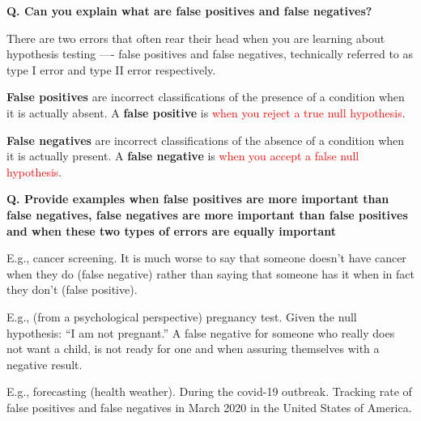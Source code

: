 \begin{frame}[fragile]{\textbf{Q. Can you explain what are false positives and false negatives?}}
  \begin{wideitemize}
  \item There are two errors that often rear their head when you are learning
    about hypothesis testing —- false positives and false negatives, technically
    referred to as type I error and type II error respectively.
  \item \textbf{False positives} are incorrect classifications of the presence
    of a condition when it is actually absent. A \textbf{false positive} is \textcolor{red}{when you
      reject a true null hypothesis}.
  \item \textbf{False negatives} are incorrect classifications of the absence of
    a condition when it is actually present. A \textbf{false negative} is \textcolor{red}{when you accept
      a false null hypothesis}.
  \end{wideitemize}
\end{frame}

\begin{frame}[fragile]{\textbf{Q. Provide examples when false positives are more
      important than false negatives, false negatives are more important than
      false positives and when these two types of errors are equally important}}
  \begin{wideitemize}
  \item E.g., cancer screening. It is much worse to say that someone
    doesn't have cancer when they do (false negative) rather than saying that
    someone has it when in fact they don't (false positive).
  \item E.g., (from a psychological perspective) pregnancy test. Given the null
    hypothesis: ``I am not pregnant.'' A false negative for someone who really
    does not want a child, is not ready for one and when assuring themselves
    with a negative result.
  \item E.g., forecasting (health weather). During the covid-19 outbreak.
    Tracking rate of false positives and false negatives in March 2020 in the
    United States of America.
  \end{wideitemize}
\end{frame}

